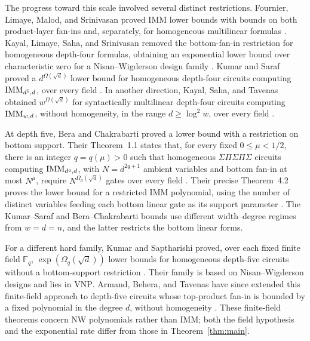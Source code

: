 The progress toward this scale involved several distinct restrictions.
Fournier, Limaye, Malod, and Srinivasan proved
IMM lower bounds with bounds on both product-layer fan-ins and, separately,
for homogeneous multilinear formulas
\cite[Theorems~16 and~29 of the cited author version]{FournierLimayeMalodSrinivasan2015}.
Kayal, Limaye, Saha, and Srinivasan removed the bottom-fan-in restriction
for homogeneous depth-four formulas, obtaining an exponential lower bound
over characteristic zero for a Nisan--Wigderson design family
\cite[Theorem~1]{KayalLimayeSahaSrinivasan2014}.
Kumar and Saraf proved a $d^{\Omega(\sqrt d)}$ lower bound for homogeneous
depth-four circuits computing $\operatorname{IMM}_{d^5,d}$, over every field
\cite[Theorem~1.2 and Section~8.2 of the cited preprint]{KumarSaraf2014}.
In another direction, Kayal, Saha, and Tavenas obtained
$w^{\Omega(\sqrt d)}$ for syntactically multilinear depth-four circuits
computing $\operatorname{IMM}_{w,d}$, without homogeneity, in the range
$d\geq\log^2 w$, over every field
\cite[Theorem~1.4 and the following comparison]{KayalSahaTavenas2018}.

At depth five, Bera and Chakrabarti proved a lower bound with a restriction
on bottom support.
Their Theorem~1.1 states that, for every fixed $0\leq\mu<1/2$, there is
an integer $q=q(\mu)>0$ such that homogeneous
$\Sigma\Pi\Sigma\Pi\Sigma$ circuits computing $\operatorname{IMM}_{d^q,d}$, with
$N=d^{2q+1}$ ambient variables and bottom fan-in at most $N^\mu$, require
$N^{\Omega_\mu(\sqrt d)}$ gates over every field
\cite[Theorem~1.1]{BeraChakrabarti2015}.
Their precise Theorem~4.2 proves the lower bound for a restricted IMM
polynomial, using the number of distinct variables feeding each bottom
linear gate as its support parameter
\cite[Theorem~4.2]{BeraChakrabarti2015}.
The Kumar--Saraf and Bera--Chakrabarti bounds use different width--degree
regimes from $w=d=n$, and the latter restricts the bottom linear forms.

For a different hard family, Kumar and Saptharishi proved, over each fixed
finite field $\mathbb F_q$,
$\exp(\Omega_q(\sqrt d))$ lower bounds for homogeneous depth-five circuits
without a bottom-support restriction
\cite[Theorem~1]{KumarSaptharishi2017}.
Their family is based on Nisan--Wigderson designs and lies in
$\mathrm{VNP}$.
Armand, Behera, and Tavenas have since extended this finite-field approach
to depth-five circuits whose top-product fan-in is bounded by a fixed
polynomial in the degree $d$, without homogeneity
\cite[Corollary~1.3]{ArmandBeheraTavenas2026}.
These finite-field theorems concern NW polynomials rather than IMM; both
the field hypothesis and the exponential rate differ from those in
Theorem~\ref{thm:main}.

